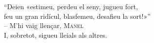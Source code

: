 
\newpage
\vspace*{2cm}
\pagestyle{empty}
\begin{center}
    ``Deien «estimeu, perdeu el seny, jugueu fort, \\
    feu un gran ridícul, blasfemeu, desafieu la sort!»'' \\
    \vspace{0.3cm}
    -- M'hi vaig llençar, \textsc{Manel} \\
    \vspace{3cm}
    I, sobretot, sigueu lleials als altres. 
\end{center}


